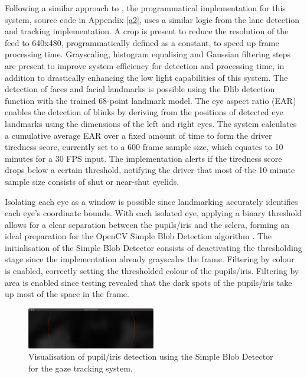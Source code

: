 \documentclass[9pt,conference]{IEEEtran}
\begin{document}
Following a similar approach to \cite{b15}, the programmatical implementation for this system, source code in Appendix \ref{a2}, uses a similar logic from the lane detection and tracking implementation. A crop is present to reduce the resolution of the feed to 640x480, programmatically defined as a constant, to speed up frame processing time. Grayscaling, histogram equalising and Gaussian filtering steps are present to improve system efficiency for detection and processing time, in addition to drastically enhancing the low light capabilities of this system. The detection of faces and facial landmarks is possible using the Dlib detection function with the trained 68-point landmark model. The eye aspect ratio (EAR) enables the detection of blinks by deriving from the positions of detected eye landmarks using the dimensions of the left and right eyes. The system calculates a cumulative average EAR over a fixed amount of time to form the driver tiredness score, currently set to a 600 frame sample size, which equates to 10 minutes for a 30 FPS input. The implementation alerts if the tiredness score drops below a certain threshold, notifying the driver that most of the 10-minute sample size consists of shut or near-shut eyelids.

Isolating each eye as a window is possible since landmarking accurately identifies each eye's coordinate bounds. With each isolated eye, applying a binary threshold allows for a clear separation between the pupils/iris and the sclera, forming an ideal preparation for the OpenCV Simple Blob Detection algorithm \cite{b16}. The initialisation of the Simple Blob Detector consists of deactivating the thresholding stage since the implementation already grayscales the frame. Filtering by colour is enabled, correctly setting the thresholded colour of the pupils/iris. Filtering by area is enabled since testing revealed that the dark spots of the pupils/iris take up most of the space in the frame.

\begin{figure}[htbp]
    \centerline{\includegraphics[width=0.5\textwidth]{assets/gaze-detection.png}}
    \caption{Visualisation of pupil/iris detection using the Simple Blob Detector for the gaze tracking system.}
    \label{f6}
\end{figure}
\end{document}
